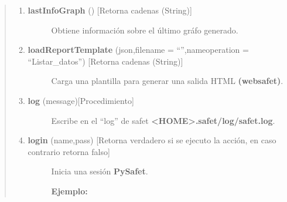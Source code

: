 \documentclass[letterpaper,11pt,spanish]{sphinxmanual}
\begin{document}
\begin{quote}
\begin{enumerate}
\begin{description}
\end{description}

\item {} \begin{description}
\item[{\textbf{lastInfoGraph} () {[}Retorna cadenas (String){]}}] \leavevmode
Obtiene información sobre el último gráfo generado.

\end{description}

\item {} \begin{description}
\item[{\textbf{loadReportTemplate} (json,filename = ``'',nameoperation = ``Listar\_datos'') {[}Retorna cadenas (String){]}}] \leavevmode
Carga una plantilla para generar una salida HTML \textbf{(websafet)}.

\end{description}

\item {} \begin{description}
\item[{\textbf{log} (message){[}Procedimiento{]}}] \leavevmode
Escribe en el ``log'' de safet  \textbf{\textless{}HOME\textgreater{}.safet/log/safet.log}.

\end{description}

\item {} \begin{description}
\item[{\textbf{login} (name,pass) {[}Retorna verdadero si se ejecuto la acción, en caso contrario retorna falso{]}}] \leavevmode
Inicia una sesión \textbf{PySafet}.

\textbf{Ejemplo:}


\end{description}
\end{enumerate}
\end{quote}
\end{document}
